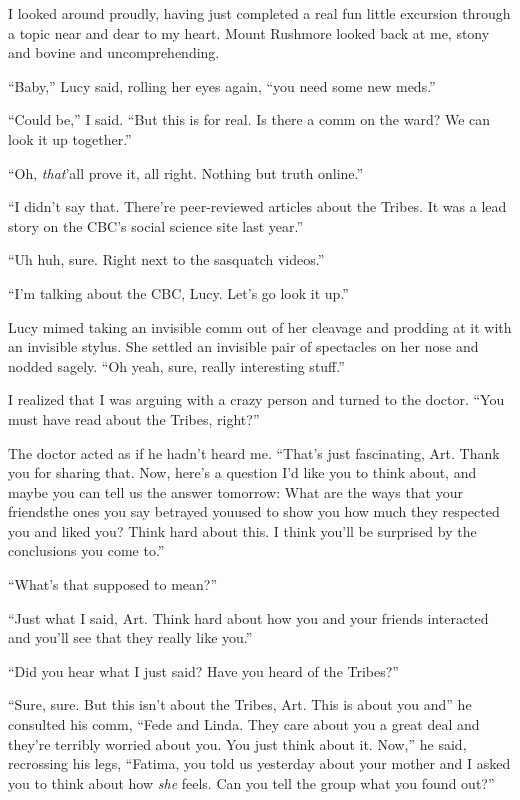 I looked around proudly, having just completed a real fun little
excursion through a topic near and dear to my heart. Mount Rushmore
looked back at me, stony and bovine and uncomprehending.

“Baby,” Lucy said, rolling her eyes again, “you need some new
meds.”

“Could be,” I said. “But this is for real. Is there a comm on the
ward? We can look it up together.”

“Oh, \emph{that}’all prove it, all right. Nothing but truth
online.”

“I didn’t say that. There’re peer-reviewed articles about the
Tribes. It was a lead story on the CBC’s social science site last
year.”

“Uh huh, sure. Right next to the sasquatch videos.”

“I’m talking about the CBC, Lucy. Let’s go look it up.”

Lucy mimed taking an invisible comm out of her cleavage and
prodding at it with an invisible stylus. She settled an invisible
pair of spectacles on her nose and nodded sagely. “Oh yeah, sure,
really interesting stuff.”

I realized that I was arguing with a crazy person and turned to the
doctor. “You must have read about the Tribes, right?”

The doctor acted as if he hadn’t heard me. “That’s just
fascinating, Art. Thank you for sharing that. Now, here’s a
question I’d like you to think about, and maybe you can tell us the
answer tomorrow: What are the ways that your friends{\dash}the ones you
say betrayed you{\dash}used to show you how much they respected you and
liked you? Think hard about this. I think you’ll be surprised by
the conclusions you come to.”

“What’s that supposed to mean?”

“Just what I said, Art. Think hard about how you and your friends
interacted and you’ll see that they really like you.”

“Did you hear what I just said? Have you heard of the Tribes?”

“Sure, sure. But this isn’t about the Tribes, Art. This is about
you and{\dash}” he consulted his comm, “Fede and Linda. They care about
you a great deal and they’re terribly worried about you. You just
think about it. Now,” he said, recrossing his legs, “Fatima, you
told us yesterday about your mother and I asked you to think about
how \emph{she} feels. Can you tell the group what you found out?”


